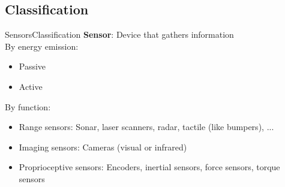 \documentclass[10pt,compress]{beamer} %
\begin{document}
\subsection{Classification}
\begin{frame}{Sensors}{Classification}
	\textbf{Sensor}: Device that gathers information\\
	By energy emission:
	\begin{itemize}
		\item Passive
		\item Active
	\end{itemize}
	By function:
	\begin{itemize}
		\item Range sensors: Sonar, laser scanners, radar, tactile (like bumpers), ...
		\item Imaging sensors: Cameras (visual or infrared)
		\item Proprioceptive sensors: Encoders, inertial sensors, force sensors, torque sensors
	\end{itemize}
\end{frame}
\end{document}
